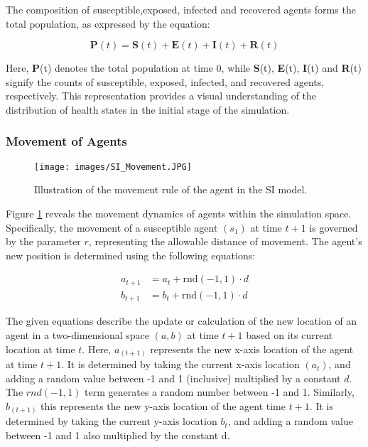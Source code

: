 The composition of  susceptible,exposed, infected and recovered agents forms the total population, as expressed by the equation:

\[
\textbf{P}(t) = \textbf{S}(t) +\textbf{E}(t) + \textbf{I}(t) + \textbf{R}(t)
\]

Here, \textbf{P}(t) denotes the total population at time 0, while \textbf{S}(t), \textbf{E}(t), \textbf{I}(t) and \textbf{R}(t) signify the counts of susceptible, exposed, infected, and recovered agents, respectively. This representation provides a visual understanding of the distribution of health states in the initial stage of the simulation.

\subsubsection{ Movement of Agents}    
\label{agent_move}
\begin{figure}[H]
	\centering
	{\texttt{[image: images/SI\_Movement.JPG]}}
	\caption{Illustration of the movement rule of the agent in the SI model.}
	\label{move}
\end{figure}

Figure \ref{move} reveals the movement dynamics of agents within the simulation space. Specifically, the movement of a susceptible agent $(s_1)$ at time $t+1$ is governed by the parameter $r$, representing the allowable distance of movement. The agent's new position is determined using the following equations:

\begin{align*}
	a_{t+1} &= a_t + \text{rnd}(-1,1) \cdot d \\
	b_{t+1} &= b_t + \text{rnd}(-1,1) \cdot d
\end{align*}


The given equations describe the update or calculation of the new location of an agent in a two-dimensional space $(a, b)$ at time $t+1$ based on its current location at time $t$. Here, $a_{(t+1)}$ represents the new x-axis location of the agent at time $t + 1$. It is determined by taking the current x-axis location $(a_t)$, and adding a random value between -1 and 1 (inclusive) multiplied by a constant $d$. The $rnd(-1,1)$ term generates a random number between -1 and 1. Similarly, $b_{(t+1)}$  this represents the new y-axis location of the agent time $t + 1 $. It is determined by taking the current y-axis location $b_t$, and adding a random value between -1 and 1 also multiplied by the constant d. 

